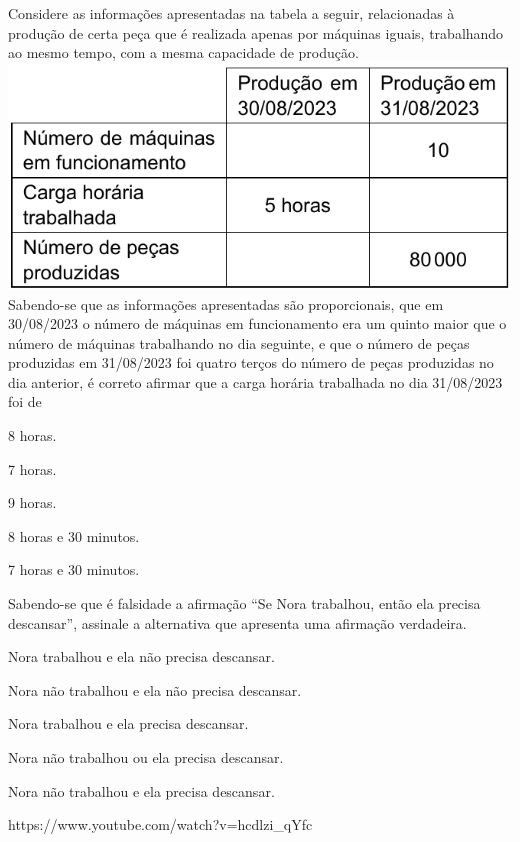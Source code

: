 \begin{Large}
\quest
{Considere as informações apresentadas na tabela a seguir, relacionadas à produção de certa peça que é
realizada apenas por máquinas iguais, trabalhando ao mesmo tempo, com a mesma capacidade de produção.\\
\includegraphics[scale=.5]{fig002}\\
Sabendo-se que as informações apresentadas são proporcionais, que em 30/08/2023 o número de máquinas em funcionamento era um quinto maior que o número de máquinas trabalhando no dia seguinte, e que o número de peças produzidas em 31/08/2023 foi quatro terços do número de peças produzidas no dia anterior, é correto afirmar que a carga horária trabalhada no dia 31/08/2023 foi de}
{
\item 8 horas.
\item 7 horas.
\item 9 horas.
\item 8 horas e 30 minutos.
\item 7 horas e 30 minutos.}
{\canal}

\questao{}
{Sabendo-se que é falsidade a afirmação “Se Nora trabalhou, então ela precisa descansar”, assinale a alternativa que apresenta uma afirmação verdadeira.
}
{
\item Nora trabalhou e ela não precisa descansar.
\item Nora não trabalhou e ela não precisa descansar.
\item Nora trabalhou e ela precisa descansar.
\item Nora não trabalhou ou ela precisa descansar.
\item Nora não trabalhou e ela precisa descansar.}
{https://www.youtube.com/watch?v=hcdlzi_qYfc}


\end{Large}
